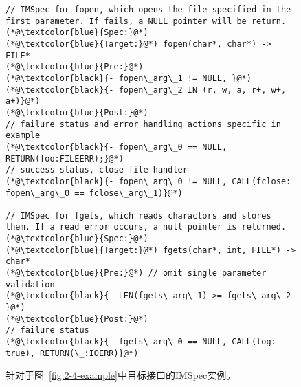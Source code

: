 \begin{figure}[t]
	\centering
	\begin{lstlisting}
// IMSpec for fopen, which opens the file specified in the first parameter. If fails, a NULL pointer will be return.
(*@\textcolor{blue}{Spec:}@*)
(*@\textcolor{blue}{Target:}@*) fopen(char*, char*) -> FILE*
(*@\textcolor{blue}{Pre:}@*) 
(*@\textcolor{black}{- fopen\_arg\_1 != NULL, }@*)
(*@\textcolor{black}{- fopen\_arg\_2 IN (r, w, a, r+, w+, a+)}@*)
(*@\textcolor{blue}{Post:}@*) 
// failure status and error handling actions specific in example
(*@\textcolor{black}{- fopen\_arg\_0 == NULL, RETURN(foo:FILEERR);}@*)
// success status, close file handler
(*@\textcolor{black}{- fopen\_arg\_0 != NULL, CALL(fclose: fopen\_arg\_0 == fclose\_arg\_1)}@*)

// IMSpec for fgets, which reads charactors and stores them. If a read error occurs, a null pointer is returned.
(*@\textcolor{blue}{Spec:}@*)
(*@\textcolor{blue}{Target:}@*) fgets(char*, int, FILE*) -> char*
(*@\textcolor{blue}{Pre:}@*) // omit single parameter validation
(*@\textcolor{black}{- LEN(fgets\_arg\_1) >= fgets\_arg\_2 }@*)
(*@\textcolor{blue}{Post:}@*)
// failure status 
(*@\textcolor{black}{- fgets\_arg\_0 == NULL, CALL(log: true), RETURN(\_:IOERR)}@*)
	\end{lstlisting}
	\caption{
		针对于图~\ref{fig:2-4-example}中目标接口的IMSpec实例。
	}
	\label{fig:2-4-example-imspec}
\end{figure}